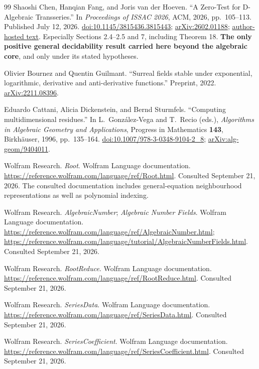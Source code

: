 \documentclass[11pt,letterpaper]{article}
\numberwithin{equation}{section}
\theoremstyle{definition}
\theoremstyle{remark}
\begin{document}
\begin{thebibliography}{99}
Shaoshi Chen, Hanqian Fang, and Joris van der Hoeven. ``A Zero-Test for
D-Algebraic Transseries.'' In \emph{Proceedings of ISSAC 2026}, ACM, 2026,
pp.~105--113. Published July 12, 2026.
\href{https://doi.org/10.1145/3815436.3815443}{doi:10.1145/3815436.3815443};
\href{https://arxiv.org/abs/2602.01188}{arXiv:2602.01188};
\href{https://www.texmacs.org/joris/zttr/zttr.html}{author-hosted text}.
Especially Sections 2.4--2.5 and 7, including Theorem 18. \textbf{The only
positive general decidability result carried here beyond the algebraic core},
and only under its stated hypotheses.

Olivier Bournez and Quentin Guilmant. ``Surreal fields stable under exponential,
logarithmic, derivative and anti-derivative functions.'' Preprint, 2022.
\href{https://arxiv.org/abs/2211.08396}{arXiv:2211.08396}.

Eduardo Cattani, Alicia Dickenstein, and Bernd Sturmfels. ``Computing
multidimensional residues.'' In L.~Gonz\'alez-Vega and T.~Recio (eds.),
\emph{Algorithms in Algebraic Geometry and Applications}, Progress in
Mathematics \textbf{143}, Birkh\"auser, 1996, pp.~135--164.
\href{https://doi.org/10.1007/978-3-0348-9104-2_8}{doi:10.1007/978-3-0348-9104-2\_8};
\href{https://arxiv.org/abs/alg-geom/9404011}{arXiv:alg-geom/9404011}.

Wolfram Research. \emph{Root}. Wolfram Language documentation.
\url{https://reference.wolfram.com/language/ref/Root.html}. Consulted
September 21, 2026. The consulted documentation includes general-equation
neighbourhood representations as well as polynomial indexing.

Wolfram Research. \emph{AlgebraicNumber}; \emph{Algebraic Number Fields}.
Wolfram Language documentation.
\url{https://reference.wolfram.com/language/ref/AlgebraicNumber.html};
\url{https://reference.wolfram.com/language/tutorial/AlgebraicNumberFields.html}.
Consulted September 21, 2026.

Wolfram Research. \emph{RootReduce}. Wolfram Language documentation.
\url{https://reference.wolfram.com/language/ref/RootReduce.html}. Consulted
September 21, 2026.

Wolfram Research. \emph{SeriesData}. Wolfram Language documentation.
\url{https://reference.wolfram.com/language/ref/SeriesData.html}. Consulted
September 21, 2026.

Wolfram Research. \emph{SeriesCoefficient}. Wolfram Language documentation.
\url{https://reference.wolfram.com/language/ref/SeriesCoefficient.html}.
Consulted September 21, 2026.


\end{thebibliography}
\end{document}
